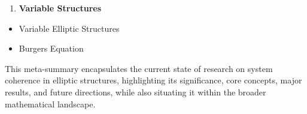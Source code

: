 \documentclass[11pt,a4paper]{article}
\begin{document}
\begin{enumerate}
\item \textbf{Variable Structures}
\end{enumerate}
\begin{itemize}
\item Variable Elliptic Structures
\item Burgers Equation
\end{itemize}

This meta-summary encapsulates the current state of research on system coherence in elliptic structures, highlighting its significance, core concepts, major results, and future directions, while also situating it within the broader mathematical landscape.
\end{document}
